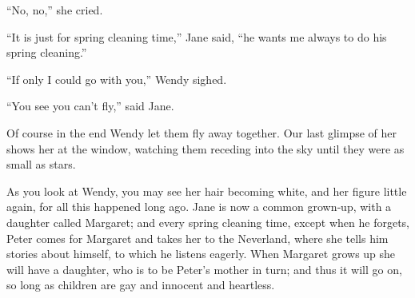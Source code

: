 “No, no,” she cried.

“It is just for spring cleaning time,” Jane said,
“he wants me always to do his spring cleaning.”

“If only I could go with you,” Wendy sighed.

“You see you can’t fly,” said Jane.

Of course in the end Wendy let them fly away together.
Our last glimpse of her shows her at the window,
watching them receding into the sky until they were as small as stars.

As you look at Wendy,
you may see her hair becoming white,
and her figure little again,
for all this happened long ago.
Jane is now a common grown‐up,
with a daughter called Margaret;
and every spring cleaning time,
except when he forgets,
Peter comes for Margaret and takes her to the Neverland,
where she tells him stories about himself,
to which he listens eagerly.
When Margaret grows up she will have a daughter,
who is to be Peter’s mother in turn;
and thus it will go on,
so long as children are gay and innocent and heartless.

\endinput
